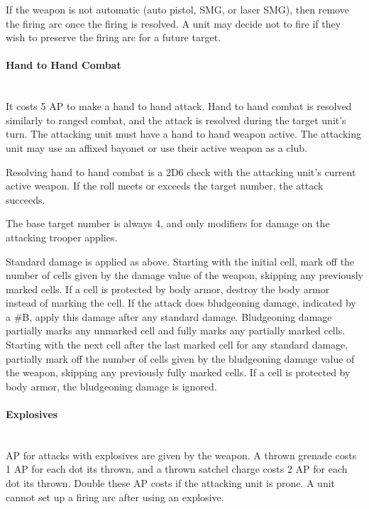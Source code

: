 If the weapon is not automatic (auto pistol, SMG, or laser SMG), then remove the firing arc once the firing is resolved.
A unit may decide not to fire if they wish to preserve the firing arc for a future target.

\paragraph*{Hand to Hand Combat}

~\\

It costs 5 AP to make a hand to hand attack.
Hand to hand combat is resolved similarly to ranged combat, and the attack is resolved during the target unit's turn.
The attacking unit must have a hand to hand weapon active.
The attacking unit may use an affixed bayonet or use their active weapon as a club.

Resolving hand to hand combat is a 2D6 check with the attacking unit's current active weapon.
If the roll meets or exceeds the target number, the attack succeeds.

The base target number is always 4, and only modifiers for damage on the attacking trooper applies.

Standard damage is applied as above.
Starting with the initial cell, mark off the number of cells given by the damage value of the weapon, skipping any previously marked cells.
If a cell is protected by body armor, destroy the body armor instead of marking the cell.
If the attack does bludgeoning damage, indicated by a \#B, apply this damage after any standard damage.
Bludgeoning damage partially marks any unmarked cell and fully marks any partially marked cells.
Starting with the next cell after the last marked cell for any standard damage, partially mark off the number of cells given by the bludgeoning damage value of the weapon, skipping any previously fully marked cells.
If a cell is protected by body armor, the bludgeoning damage is ignored.

\paragraph*{Explosives}

~\\

AP for attacks with explosives are given by the weapon.
A thrown grenade costs 1 AP for each dot its thrown, and a thrown satchel charge costs 2 AP for each dot its thrown.
Double these AP costs if the attacking unit is prone.
A unit cannot set up a firing arc after using an explosive.

